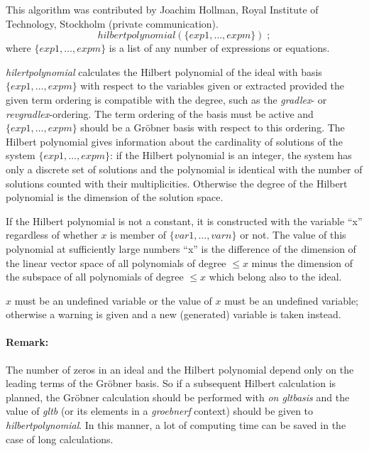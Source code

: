 This algorithm was contributed by {\sc Joachim Hollman}, Royal
Institute of Technology, Stockholm (private communication).
\hypertarget{operator:HILBERTPOLYNOMIAL}{}
\[
hilbertpolynomial (\{exp1, \ldots , expm\})\;;
\]
where $\{exp1, \ldots , expm\}$ is a list of any number of expressions
or equations.

\emph{hilertpolynomial} calculates the Hilbert polynomial of the ideal
with basis $\{exp1, \ldots , expm\}$ with respect to the
variables given or extracted provided the given term ordering is
compatible with the degree, such as the \emph{gradlex}- or \emph{revgradlex}-ordering.
The term ordering of the basis
must be active and $\{exp1, \ldots, expm\}$ should be a
Gr\"obner basis with respect to this ordering. The Hilbert polynomial
gives information about the cardinality of solutions of the system
$\{exp1, \ldots , expm\}$: if the Hilbert polynomial is an
integer, the system has only a discrete set of solutions and the
polynomial is identical with the number of solutions counted with
their multiplicities. Otherwise the degree of the Hilbert
polynomial is the dimension of the solution space.

If the Hilbert polynomial is not a constant, it is constructed with the
variable ``x'' regardless of whether $x$ is member of
$\{var1, \ldots , varn\}$ or not. The value of this polynomial at
sufficiently large numbers  ``x'' is the difference
of the dimension of the linear vector space of all polynomials of degree
$ \leq x $ minus the dimension of the subspace of all polynomials of
degree $\leq x $ which belong also to the ideal.

$x$ must be an undefined variable or the value of $x$ must be an undefined
variable; otherwise a warning is given and a new (generated) variable
is taken instead.

\paragraph{Remark:} The number of zeros in an ideal and the
Hilbert polynomial depend only on the leading terms of the
Gr\"obner basis. So if a subsequent Hilbert calculation is planned, the
Gr\"obner calculation should be performed with \emph{on gltbasis} and
the value of \emph{gltb} (or its elements in a \emph{groebnerf} context) should be
given to \emph{hilbertpolynomial}. In this manner, a lot of computing time can be
saved in the case of long calculations.

